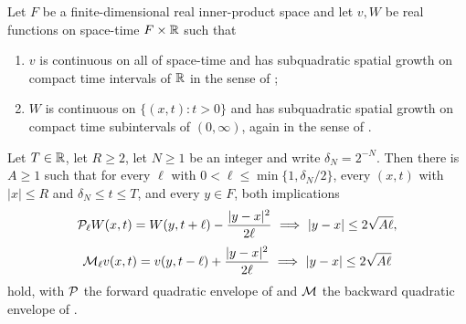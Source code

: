 \begin{helper}
Let $F$ be a finite-dimensional real inner-product space and let
$v,W$ be real functions on space-time $F\times\mathbb{R}$ such that
\begin{enumerate}
\item $v$ is continuous on all of space-time and has subquadratic spatial growth
on compact time intervals of $\mathbb{R}$ in the sense of ;
\item $W$ is continuous on $\{(x,t):t>0\}$ and has subquadratic spatial growth on
compact time subintervals of $(0,\infty)$, again in the sense of
.
\end{enumerate}
Let $T\in\mathbb{R}$, let $R\ge2$, let $N\ge1$ be an integer and write
$\delta_N=2^{-N}$. Then there is $A\ge1$ such that for every $\ell$ with
$0<\ell\le\min\{1,\delta_N/2\}$, every $(x,t)$ with $|x|\le R$ and
$\delta_N\le t\le T$, and every $y\in F$, both implications
\[
  \mathcal{P}_\ell W(x,t)=W(y,t+\ell)-\frac{|y-x|^2}{2\ell}
    \ \Longrightarrow\ |y-x|\le2\sqrt{A\ell},
\]
\[
  \mathcal{M}_\ell v(x,t)=v(y,t-\ell)+\frac{|y-x|^2}{2\ell}
    \ \Longrightarrow\ |y-x|\le2\sqrt{A\ell}
\]
hold, with $\mathcal{P}$ the forward quadratic envelope of  and
$\mathcal{M}$ the backward quadratic envelope of .
\end{helper}
